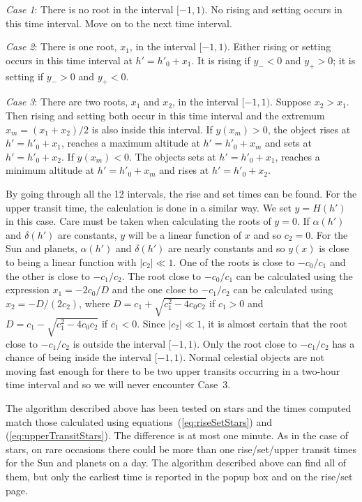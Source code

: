 \documentclass[12pt]{article}
\begin{document}
{\em Case 1}: There is no root in the interval $[-1,1)$. No rising and setting 
occurs in this time interval. Move on to the next time interval. 

{\em Case 2}: There is one root, $x_1$, in the interval $[-1,1)$. Either rising or 
setting occurs in this time interval at $h'=h'_0+x_1$. It is rising if $y_-<0$ and 
$y_+>0$; it is setting if $y_->0$ and $y_+<0$. 

{\em Case 3}: There are two roots, $x_1$ and $x_2$, in the interval $[-1,1)$. Suppose 
$x_2>x_1$. Then rising and setting both occur in this time interval and the extremum 
$x_m=(x_1+x_2)/2$ is also inside this interval. If $y(x_m) > 0$, the object rises 
at $h'=h'_0+x_1$, reaches a maximum altitude at $h'=h'_0+x_m$ and sets at 
$h'=h'_0+x_2$. If $y(x_m)<0$. The objects sets at $h'=h'_0+x_1$, reaches 
a minimum altitude at $h'=h'_0+x_m$ and rises at $h'=h'_0+x_2$. 

By going through all the 12 intervals, the rise and set times can be found. 
For the upper transit time, the calculation is done in a similar way. We set 
$y = H(h')$ in this case. Care must be taken when calculating the roots of $y=0$. 
If $\alpha(h')$ and $\delta(h')$ are constants, $y$ will be a linear function of $x$ 
and so $c_2=0$. For the Sun and planets, $\alpha(h')$ and $\delta(h')$ 
are nearly constants and so $y(x)$ is close to being a linear function with $|c_2|\ll 1$. 
One of the roots is close to $-c_0/c_1$ and the other is close to $-c_1/c_2$. 
The root close to $-c_0/c_1$ can be calculated using the expression $x_1=-2c_0/D$ 
and the one close to $-c_1/c_2$ can be calculated using $x_2=-D/(2 c_2)$, where 
$D=c_1+\sqrt{c_1^2-4c_0c_2}$ if $c_1>0$ and $D=c_1-\sqrt{c_1^2-4c_0c_2}$ if $c_1<0$. 
Since $|c_2|\ll 1$, it is almost certain that the root close to $-c_1/c_2$ 
is outside the interval $[-1,1)$. Only the root close to $-c_1/c_2$ has a chance 
of being inside the interval $[-1,1)$. Normal celestial objects are not moving 
fast enough for there to be two upper transits occurring in a two-hour time interval 
and so we will never encounter Case~3. 

The algorithm described above has been tested on stars and the times computed 
match those calculated using equations~(\ref{eq:riseSetStars}) and 
(\ref{eq:upperTransitStars}). The difference is at most one minute.
As in the case of stars, on rare occasions there could be more than one 
rise/set/upper transit times for the Sun and planets on a day. The 
algorithm described above can find all of them, but only the earliest 
time is reported in the popup box and on the rise/set page.
\end{document}
